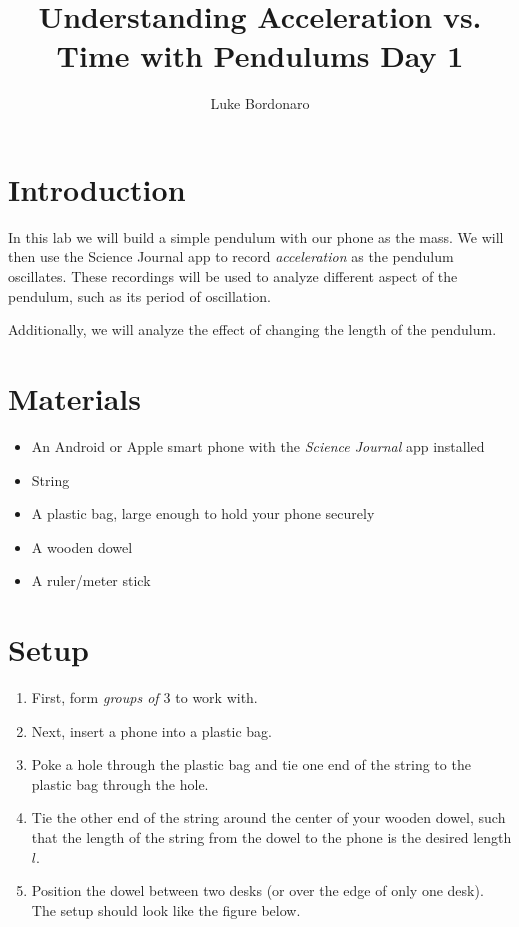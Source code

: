\documentclass[a4paper]{article}
\title{Understanding Acceleration vs. Time with Pendulums Day 1}
\author{Luke Bordonaro}
\date{}
\begin{document}
\maketitle

\section{Introduction}

In this lab we will build a simple pendulum with our phone as the mass. We will then use the Science Journal app to record \textit{acceleration} as the pendulum oscillates. These recordings will be used to analyze different aspect of the pendulum, such as its period of oscillation.

Additionally, we will analyze the effect of changing the length of the pendulum. 

\section{Materials}
\begin{itemize}
    \item An Android or Apple smart phone with the \textit{Science Journal} app installed
    \item String
    \item A plastic bag, large enough to hold your phone securely
    \item A wooden dowel
    \item A ruler/meter stick
\end{itemize}

\section{Setup}

\begin{enumerate}
    \item First, form \textit{groups of $3$} to work with.
    \item Next, insert a phone into a plastic bag. 
    \item Poke a hole through the plastic bag and tie one end of the string to the plastic bag through the hole.
    \item Tie the other end of the string around the center of your wooden dowel, such that the length of the string from the dowel to the phone is the desired length $l$.
    \item Position the dowel between two desks (or over the edge of only one desk). The setup should look like the figure below.
\end{enumerate}
\end{document}
